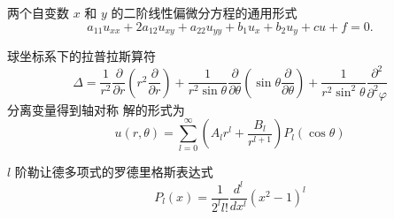 \documentclass{njustexam}
\begin{document}
两个自变数 $x$ 和 $y$ 的二阶线性偏微分方程的通用形式
\begin{equation*}
    a_{11} u_{x x}+2 a_{12} u_{x y}+a_{22} u_{y y}+b_1 u_x+b_2 u_y+c u+f=0.
    \label{eq:two_variable_diff_equation}
\end{equation*}

球坐标系下的拉普拉斯算符
\begin{equation*}
 \Delta = \frac{1}{r^2} \frac{\partial}{\partial r} \left( r^2 \frac{\partial }{\partial r} \right)
  + \frac{1}{r^2\sin \theta} \frac{\partial}{\partial \theta} \left( \sin\theta \frac{\partial}{\partial \theta} \right)
  + \frac{1}{r^2\sin^2 \theta} \frac{\partial^2}{\partial^2 \varphi}
\end{equation*}
分离变量得到轴对称
解的形式为
\begin{equation*}
  u(r, \theta) = \sum_{l=0}^{\infty} \left( A_l r^l + \frac{B_l}{r^{l+1}} \right) P_{l} (\cos \theta)
\end{equation*}

$l$ 阶勒让德多项式的罗德里格斯表达式 
$$P_l(x)=\frac{1}{2^l l !} \frac{d^l}{d x^l}\left(x^2-1\right)^l$$
\end{document}
